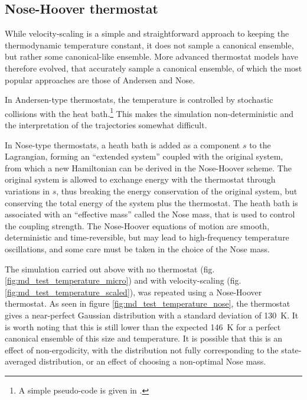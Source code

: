 \documentclass[11pt,bibliography=totoc,index=totoc]{scrbook}   %
\begin{document}
%
\subsection{Nose-Hoover thermostat}\label{sec:nose-hoover}
%

While velocity-scaling is a simple and straightforward approach to keeping the thermodynamic temperature constant, it does not sample a canonical ensemble, but rather some canonical-like ensemble. 
More advanced thermostat models have therefore evolved, that accurately sample a canonical ensemble, of which the most popular approaches are those of Andersen\cite{Andersen:1980} and Nose\cite{Nose:1984,Nose:1991,Bylander:1992}.

In Andersen-type thermostats, the temperature is controlled by stochastic collisions with the heat bath.\footnote{
A simple pseudo-code is given in \cite[129]{Frenkel:1996}.}
This makes the simulation non-deterministic and the interpretation of the trajectories somewhat difficult.

In Nose-type thermostats, a heath bath is added as a component $s$ to the Lagrangian, forming an ``extended system'' coupled with the original system, from which a new Hamiltonian can be derived in the Nose-Hoover scheme.
The original system is allowed to exchange energy with the thermostat through variations in $s$, 
thus breaking the energy conservation of the original system, but conserving the total energy of the system plus the thermostat.
The heath bath is associated with an ``effective mass'' called the Nose mass, that is used to control the coupling strength.
The Nose-Hoover equations of motion are smooth, deterministic and time-reversible, but may lead to high-frequency temperature 
oscillations, and some care must be taken in the choice of the Nose mass.\cite{Hunenberger:2005}

The simulation carried out above with no thermostat (fig. \ref{fig:md_test_temperature_micro}) and with
velocity-scaling (fig. \ref{fig:md_test_temperature_scaled}), was repeated using a Nose-Hoover thermostat.
As seen in figure \ref{fig:md_test_temperature_nose}, the thermostat gives a near-perfect Gaussian distribution with a standard deviation of 130~K. 
It is worth noting that this is still lower than the expected 146~K for a perfect canonical ensemble of this size and temperature. 
It is possible that this is an effect of non-ergodicity, with the distribution not fully corresponding to the state-averaged distribution,
or an effect of choosing a non-optimal Nose mass.
\end{document}
